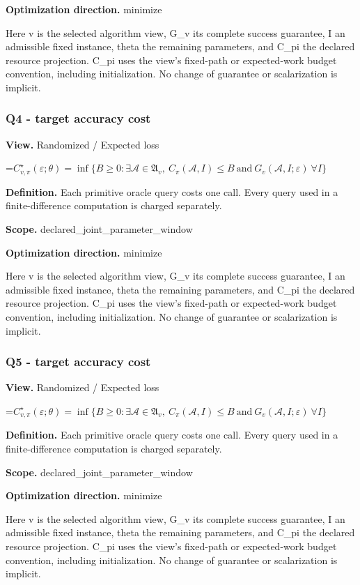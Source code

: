 \documentclass[10pt,a4paper]{article}
\newcommand{\AtlasMath}[1]{\par\begingroup\centering\setbox0=\hbox{$\displaystyle #1$}\ifdim\wd0>1.4\linewidth\typeout{ATLAS WIDE FORMULA: \the\wd0}\fi\ifdim\wd0>\linewidth\resizebox{\linewidth}{!}{\box0}\else\box0\fi\par\endgroup}
\begin{document}
\textbf{Optimization direction.} minimize

Here v is the selected algorithm view, G\_v its complete success guarantee, I an admissible fixed instance, theta the remaining parameters, and C\_pi the declared resource projection. C\_pi uses the view's fixed-path or expected-work budget convention, including initialization. No change of guarantee or scalarization is implicit.

\subsubsection{Q4 - target accuracy cost}
\textbf{View.} Randomized / Expected loss

\AtlasMath{C^\star_{v,\pi}(\varepsilon;\theta)=\inf\{B\ge0:\exists\mathcal A\in\mathfrak A_v,\ C_\pi(\mathcal A,I)\le B\ \text{and}\ G_v(\mathcal A,I;\varepsilon)\ \forall I\}}
\textbf{Definition.} Each primitive oracle query costs one call. Every query used in a finite-difference computation is charged separately.

\textbf{Scope.} declared\_joint\_parameter\_window

\textbf{Optimization direction.} minimize

Here v is the selected algorithm view, G\_v its complete success guarantee, I an admissible fixed instance, theta the remaining parameters, and C\_pi the declared resource projection. C\_pi uses the view's fixed-path or expected-work budget convention, including initialization. No change of guarantee or scalarization is implicit.

\subsubsection{Q5 - target accuracy cost}
\textbf{View.} Randomized / Expected loss

\AtlasMath{C^\star_{v,\pi}(\varepsilon;\theta)=\inf\{B\ge0:\exists\mathcal A\in\mathfrak A_v,\ C_\pi(\mathcal A,I)\le B\ \text{and}\ G_v(\mathcal A,I;\varepsilon)\ \forall I\}}
\textbf{Definition.} Each primitive oracle query costs one call. Every query used in a finite-difference computation is charged separately.

\textbf{Scope.} declared\_joint\_parameter\_window

\textbf{Optimization direction.} minimize

Here v is the selected algorithm view, G\_v its complete success guarantee, I an admissible fixed instance, theta the remaining parameters, and C\_pi the declared resource projection. C\_pi uses the view's fixed-path or expected-work budget convention, including initialization. No change of guarantee or scalarization is implicit.
\end{document}
